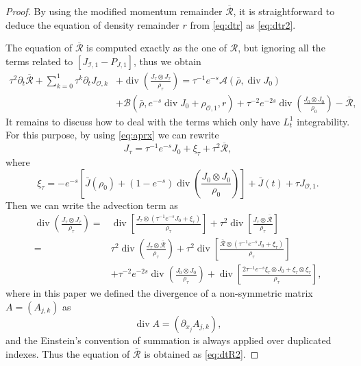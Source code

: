 \documentclass[english]{amsart}
\theoremstyle{plain}
\theoremstyle{definition}
\theoremstyle{remark}
\theoremstyle{plain}
\theoremstyle{plain}
\theoremstyle{plain}
\def\d{{\partial}}
\DeclareMathOperator{\diver}{div}
\numberwithin{equation}{section}
\begin{document}
\begin{proof}
By using the modified momentum remainder $\overline{\mathcal{R}}$, it is straightforward to deduce the equation of density remainder $r$ from \eqref{eq:dtr} as \eqref{eq:dtr2}.

The equation of $\overline{\mathcal{R}}$ is computed exactly as the one of $\mathcal{R}$, but ignoring all the terms related to $[J_{\mathcal{I},1}-P_{J,1}]$, thus we obtain
\begin{align*}
\tau^2\d_t\overline{\mathcal{R}}+\sum_{k=0}^1 \tau^{k}\d_t J_{\mathcal{O},k}&+\diver\left(\frac{J_\tau\otimes J_\tau}{\rho_\tau}\right)=\tau^{-1} e^{-s}\mathcal{A}(\bar\rho,\diver J_0)\\
&+\mathcal{B}(\bar\rho,e^{-s}\diver J_0+\rho_{\mathcal{O},1},r)
+\tau^{-2}e^{-2s}\diver\left(\frac{J_0\otimes J_0}{\rho_0}\right)-\overline{\mathcal{R}},
\end{align*}
It remains to discuss how to deal with the terms which only have $L^1_t$ integrability. For this purpose, by using \eqref{eq:aprx} we can rewrite
\[
J_\tau=\tau^{-1}e^{-s}J_0+\xi_\tau+\tau^2\overline{\mathcal{R}},
\]
where
\begin{equation}\label{eq:xi}
\xi_\tau=-e^{-s}\left[\bar J(\rho_0)+(1-e^{-s})\diver\left(\frac{J_0\otimes J_0}{\rho_0}\right)\right]+\bar J(t)+\tau J_{\mathcal{O},1}.
\end{equation}
Then we can write the advection term as
\begin{align*}
\diver\left(\frac{J_\tau\otimes J_\tau}{\rho_\tau}\right)=&\diver\left[\frac{J_\tau\otimes(\tau^{-1}e^{-s}J_0+\xi_\tau)}{\rho_\tau}\right]+\tau^2\diver\left[\frac{J_\tau\otimes\overline{\mathcal{R}}}{\rho_\tau}\right]\\
=&\tau^2\diver\left(\frac{J_\tau\otimes\overline{\mathcal{R}}}{\rho_\tau}\right)+\tau^2\diver\left[\frac{\overline{\mathcal{R}}\otimes(\tau^{-1}e^{-s}J_0+\xi_\tau)}{\rho_\tau}\right]\\
&+\tau^{-2}e^{-2s}\diver\left(\frac{J_0\otimes J_0}{\rho_\tau}\right)+\diver\left[\frac{2\tau^{-1}e^{-s}\xi_\tau\otimes J_0+\xi_\tau \otimes\xi_\tau}{\rho_\tau}\right],
\end{align*}
where in this paper we defined the divergence of a non-symmetric matrix $A=(A_{j,k})$ as
\[
\diver A=(\d_{x_j}A_{j,k}),
\]
and the Einstein's convention of summation is always applied over duplicated indexes. 
Thus the equation of $\overline{\mathcal{R}}$ is obtained as \eqref{eq:dtR2}.
\end{proof}
\end{document}
